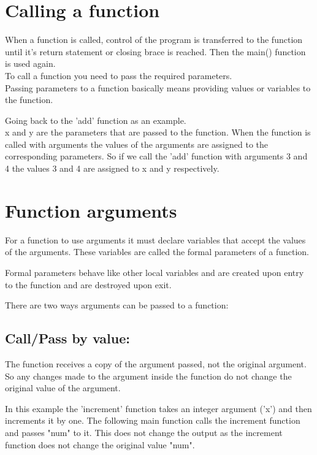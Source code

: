 \documentclass[12pt, letterpaper]{report}
\begin{document}
\section{Calling a function}
When a function is called, control of the program is transferred to the function
until it's return statement or closing brace is reached. Then the main() 
function is used again.\\

To call a function you need to pass the required parameters.\\

Passing parameters to a function basically means providing values or variables
to the function.

Going back to the 'add' function as an example. \\
x and y are the parameters that are passed to the function. When the function is
called with arguments the values of the arguments are assigned to the corresponding
parameters. So if we call the 'add' function with arguments 3 and 4 the values
3 and 4 are assigned to x and y respectively.\\

\clearpage
\section{Function arguments}
For a function to use arguments it must declare variables that accept the values
of the arguments. These variables are called the formal parameters of a function.

Formal parameters behave like other local variables and are created upon entry
to the function and are destroyed upon exit.

There are two ways arguments can be passed to a function:

\subsection{Call/Pass by value:}
The function receives a copy of the argument passed, not the original argument.
So any changes made to the argument inside the function do not change the original
value of the argument.
		
	
	In this example the 'increment' function takes an integer argument ('x') 
	and then increments it by one. The following main function calls the 
	increment function and passes "num" to it. This does not change the output 
	as the increment function does not change the original value "num".
\end{document}
